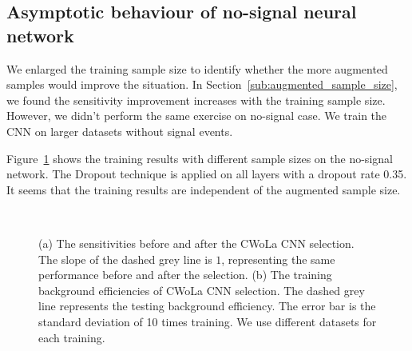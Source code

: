 \documentclass[12pt]{article}
\begin{document}
	\subsection{Asymptotic behaviour of no-signal neural network}%
	\label{sub:asymptotic_behaviour_of_no_signal_neural_network}
		We enlarged the training sample size to identify whether the more augmented samples would improve the situation. In Section~\ref{sub:augmented_sample_size}, we found the sensitivity improvement increases with the training sample size. However, we didn't perform the same exercise on no-signal case. We train the CNN on larger datasets without signal events.
		
		Figure~\ref{fig:sensitivity_improvement_background_pass_rate_aug_3_to_10} shows the training results with different sample sizes on the no-signal network. The Dropout technique is applied on all layers with a dropout rate 0.35. It seems that the training results are independent of the augmented sample size.
		\begin{figure}[htpb]
            \centering
             \\
            \caption{(a) The sensitivities before and after the CWoLa CNN selection. The slope of the dashed grey line is $1$, representing the same performance before and after the selection. (b) The training background efficiencies of CWoLa CNN selection. The dashed grey line represents the testing background efficiency. The error bar is the standard deviation of 10 times training. We use different datasets for each training.}
            \label{fig:sensitivity_improvement_background_pass_rate_aug_3_to_10}
        \end{figure}
\end{document}
